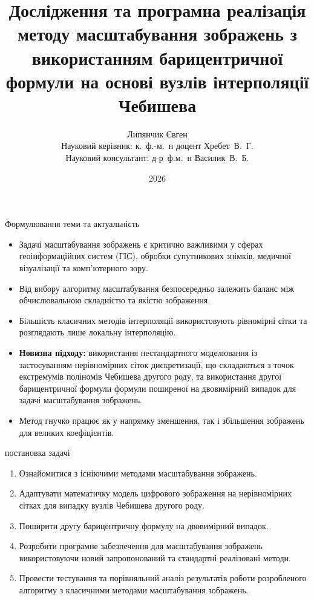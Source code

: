 \documentclass[11pt, aspectratio=169]{beamer}
\title[Барицентрична інтерполяція]{Дослідження та програмна реалізація методу масштабування зображень з використанням барицентричної формули на основі вузлів інтерполяції Чебишева}
\author{
	Липянчик Євген \\
	{\small Науковий керівник: к.~ф.-м.~н доцент Хребет~В.~Г.} \\
	{\small Науковий консультант: д-р~ф.м.~н Василик~В.~Б.}
}
\institute{Державний університет «Київський авіаційний інститут»}
\date{2026}
\begin{document}
	
	\begin{frame}
		\titlepage
	\end{frame}
	
	\begin{frame}{Формулювання теми та актуальність}
		\begin{itemize}
			\item Задачі масштабування зображень є критично важливими у сферах геоінформаційних систем (ГІС), обробки супутникових знімків, медичної візуалізації та комп'ютерного зору.
			\item Від вибору алгоритму масштабування безпосередньо залежить баланс між обчислювальною складністю та якістю зображення.
			\item Більшість класичних методів інтерполяції використовують рівномірні сітки та розглядають лише локальну інтерполяцію.
			\item \textbf{Новизна підходу:} використання нестандартного моделювання із застосуванням нерівномірних сіток дискретизації, що складаються з точок екстремумів поліномів Чебишева другого роду, та використання другої барицентричної формули формули поширеної на двовимірний випадок для задачі масштабування зображень.
			\item Метод гнучко працює як у напрямку зменшення, так і збільшення зображень для великих коефіцієнтів.
		\end{itemize}
	\end{frame}
	
	\begin{frame}{постановка задачі}
		\begin{enumerate}
			\item Ознайомитися з існіючими методами масштабування зображень.
			\item  Адаптувати математичку модель цифрового зображення на нерівномірних сітках для випадку вузлів Чебишева другого роду.
			\item Поширити другу барицентричну формулу на двовимірний випадок.
			\item Розробити програмне забезпечення для масштабування зображень використовуючи новий запропонований та стандартні реалізовані методи.
			\item Провести тестування та порівняльний аналіз результатів роботи розробленого алгоритму з класичними методами масштабування зображень.
		\end{enumerate}
	\end{frame}
	
\end{document}
